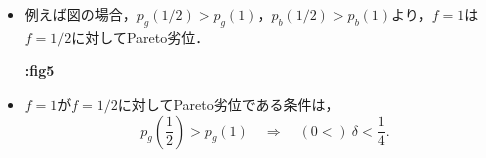 \documentclass[uplatex,12pt,dvipdfmx,xcolor=svgnames]{beamer}
\begin{document}
\begin{frame}[t]{\secII}
	
\begin{itemize}
	\item 例えば図の場合，$p_g(1/2)>p_g(1)$，$p_b(1/2)>p_b(1)$より，$f=1$は$f=1/2$に対してPareto劣位．
		
			
			\textbf{:fig5}
		
	\item $f=1$が$f=1/2$に対してPareto劣位である条件は，
		\begin{equation*}
			p_g\left(\frac{1}{2}\right) > p_g(1) \quad \Longrightarrow\quad (0<)\ \delta < \frac{1}{4}.
		\end{equation*}
\end{itemize}
	
\end{frame}

\newcommand{\secIII}{行動進化のモデル化}
\end{document}
